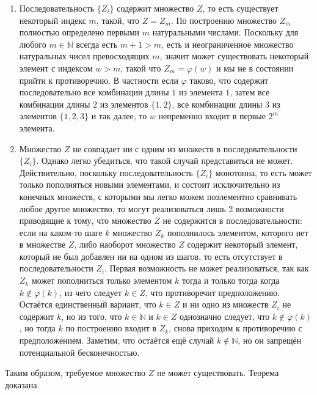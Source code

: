 \documentclass[12pt]{article}
\begin{document}
\begin{enumerate}
    \item Последовательность $\{Z_i\}$ содержит множество $Z$, то есть существует некоторый индекс $m$, такой, что $Z = Z_m$. По построению множество $Z_m$ полностью определено первыми $m$ натуральными числами. Поскольку для любого $m \in \mathbb{N}$ всегда есть $m + 1 > m$, есть и неограниченное множество натуральных чисел превосходящих $m$, значит может существовать некоторый элемент с индексом $w > m$, такой что $Z_m = \varphi(w)$ и мы не в состоянии прийти к противоречию. В частности если $\varphi$ таково, что содержит последовательно все комбинации длины $1$ из элемента $1$, затем все комбинации длины $2$ из элементов $\{1, 2\}$, все комбинации длины $3$ из элементов $\{1, 2, 3\}$ и так далее, то $w$ непременно входит в первые $2^m$ элемента.
    \item Множество $Z$ не совпадает ни с одним из множеств в последовательности $\{Z_i\}$. Однако легко убедиться, что такой случай представиться не может. Действительно, поскольку последовательность $\{Z_i\}$ монотонна, то есть может только пополняться новыми элементами, и состоит исключительно из конечных множеств, с которыми мы легко можем поэлементно сравнивать любое другое множество, то могут реализоваться лишь 2 возможности приводящие к тому, что множество $Z$ не содержится в последовательности: если на каком-то шаге $k$ множество $Z_k$ пополнилось элементом, которого нет в множестве $Z$, либо наоборот множество $Z$ содержит некоторый элемент, который не был добавлен ни на одном из шагов, то есть отсутствует в последовательности $Z_i$. Первая возможность не может реализоваться, так как $Z_k$ может пополниться только элементом $k$ тогда и только тогда когда $k \notin \varphi(k)$, из чего следует $k \in Z$, что противоречит предположению. Остаётся единственный вариант, что $k \in Z$ и ни одно из множеств $Z_i$ не содержит $k$, но из того, что $k \in \mathbb{N}$ и $k \in Z$ однозначно следует, что $k \notin \varphi(k)$, но тогда $k$ по построению входит в $Z_k$, снова приходим к противоречию с предположением. Заметим, что остаётся ещё случай $k \notin \mathbb{N}$, но он запрещён потенциальной бесконечностью. 
\end{enumerate}

Таким образом, требуемое множество $Z$ не может существовать. Теорема доказана.
\end{document}
